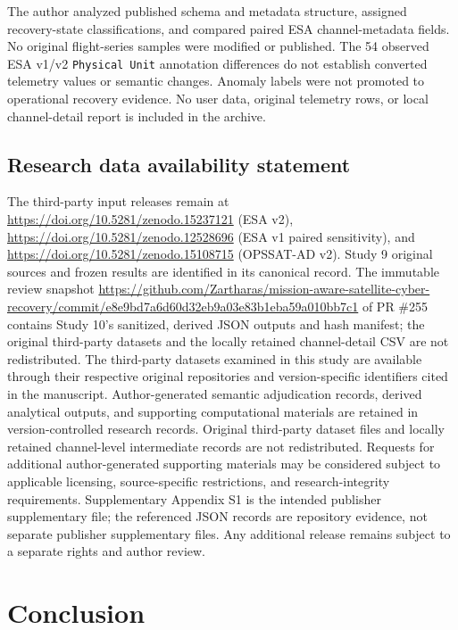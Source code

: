 \documentclass[preprint,12pt]{elsarticle}
\begin{document}
The author analyzed published schema and metadata structure, assigned recovery-state classifications, and compared paired ESA channel-metadata fields. No original flight-series samples were modified or published. The 54 observed ESA v1/v2 \texttt{Physical Unit} annotation differences do not establish converted telemetry values or semantic changes. Anomaly labels were not promoted to operational recovery evidence. No user data, original telemetry rows, or local channel-detail report is included in the archive.

\subsection{Research data availability statement}
The third-party input releases remain at \url{https://doi.org/10.5281/zenodo.15237121} (ESA v2), \url{https://doi.org/10.5281/zenodo.12528696} (ESA v1 paired sensitivity), and \url{https://doi.org/10.5281/zenodo.15108715} (OPSSAT-AD v2). Study 9 original sources and frozen results are identified in its canonical record. The immutable review snapshot \url{https://github.com/Zartharas/mission-aware-satellite-cyber-recovery/commit/e8e9bd7a6d60d32eb9a03e83b1eba59a010bb7c1} of PR \#255 contains Study 10's sanitized, derived JSON outputs and hash manifest; the original third-party datasets and the locally retained channel-detail CSV are not redistributed. The third-party datasets examined in this study are available through their respective original repositories and version-specific identifiers cited in the manuscript. Author-generated semantic adjudication records, derived analytical outputs, and supporting computational materials are retained in version-controlled research records. Original third-party dataset files and locally retained channel-level intermediate records are not redistributed. Requests for additional author-generated supporting materials may be considered subject to applicable licensing, source-specific restrictions, and research-integrity requirements. Supplementary Appendix S1 is the intended publisher supplementary file; the referenced JSON records are repository evidence, not separate publisher supplementary files. Any additional release remains subject to a separate rights and author review.

\section{Conclusion}
\end{document}

